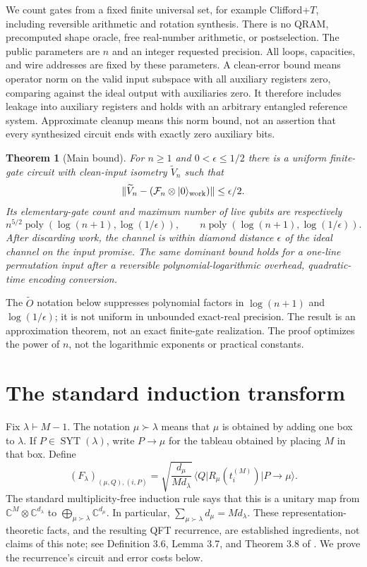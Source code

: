 \documentclass[11pt]{article}
\newtheorem{theorem}{Theorem}
\theoremstyle{definition}
\newcommand{\ket}[1]{\lvert #1\rangle}
\newcommand{\bra}[1]{\langle #1\rvert}
\newcommand{\norm}[1]{\lVert #1\rVert}
\newcommand{\F}{\mathcal F}
\newcommand{\poly}{\operatorname{poly}}
\newcommand{\SYT}{\operatorname{SYT}}
\begin{document}
We count gates from a fixed finite universal set, for example Clifford+$T$,
including reversible arithmetic and rotation synthesis. There is no QRAM,
precomputed shape oracle, free real-number arithmetic, or postselection.
The public parameters are $n$ and an integer requested precision. All loops,
capacities, and wire addresses are fixed by these parameters. A clean-error
bound means operator norm on the valid input subspace with all auxiliary
registers zero, comparing against the ideal output with auxiliaries zero.
It therefore includes leakage into auxiliary registers and holds with an
arbitrary entangled reference system. Approximate cleanup means this norm
bound, not an assertion that every synthesized circuit ends with exactly
zero auxiliary bits.

\begin{theorem}[Main bound]\label{thm:main}
For $n\ge1$ and $0<\epsilon\le1/2$ there is a uniform finite-gate circuit
with clean-input isometry $\widetilde V_n$ such that
\[
 \norm{\widetilde V_n-(\F_n\otimes\ket0_{\rm work})}\le\epsilon/2.
\]
Its elementary-gate count and maximum number of live qubits are respectively
\[
 n^{5/2}\poly(\log(n+1),\log(1/\epsilon)),\qquad
 n\poly(\log(n+1),\log(1/\epsilon)).
\]
After discarding work, the channel is within diamond distance $\epsilon$
of the ideal channel on the input promise. The same dominant bound holds
for a one-line permutation input after a reversible polynomial-logarithmic
overhead, quadratic-time encoding conversion.
\end{theorem}

The $\widetilde O$ notation below suppresses polynomial factors in
$\log(n+1)$ and $\log(1/\epsilon)$; it is not uniform in unbounded exact-real
precision. The result is an approximation theorem, not an exact finite-gate
realization. The proof optimizes the power of $n$, not the logarithmic
exponents or practical constants.

\section{The standard induction transform}

Fix $\lambda\vdash M-1$. The notation $\mu\succ\lambda$ means that $\mu$
is obtained by adding one box to $\lambda$. If $P\in\SYT(\lambda)$, write
$P\to\mu$ for the tableau obtained by placing $M$ in that box. Define
\begin{equation}\label{eq:induction}
 (F_\lambda)_{(\mu,Q),(i,P)}=
 \sqrt{\frac{d_\mu}{M d_\lambda}}\,
 \bra Q R_\mu(t_i^{(M)})\ket{P\to\mu}.
\end{equation}
The standard multiplicity-free induction rule says that this is a unitary
map from $\mathbb C^M\otimes\mathbb C^{d_\lambda}$ to
$\bigoplus_{\mu\succ\lambda}\mathbb C^{d_\mu}$. In particular,
$\sum_{\mu\succ\lambda}d_\mu=M d_\lambda$. These representation-theoretic
facts, and the resulting QFT recurrence, are established ingredients, not
claims of this note; see Definition 3.6, Lemma 3.7, and Theorem 3.8 of
\cite{bgo}. We prove the recurrence's circuit and error costs below.
\end{document}
